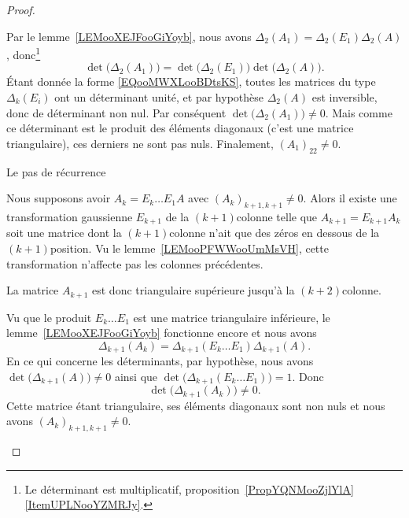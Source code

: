 \begin{proof}
\begin{subproof}
            Par le lemme~\ref{LEMooXEJFooGiYoyb}, nous avons \( \Delta_2(A_1)=\Delta_2(E_1)\Delta_2(A)\), donc\footnote{Le déterminant est multiplicatif, proposition~\ref{PropYQNMooZjlYlA}\ref{ItemUPLNooYZMRJy}.}
            \begin{equation}
                \det\big( \Delta_2(A_1) \big)=\det\big( \Delta_2(E_1) \big)\det\big( \Delta_2(A) \big).
            \end{equation}
            Étant donnée la forme \eqref{EQooMWXLooBDtsKS}, toutes les matrices du type \( \Delta_k(E_i)\) ont un déterminant unité, et par hypothèse \( \Delta_2(A)\) est inversible, donc de déterminant non nul. Par conséquent \( \det\big( \Delta_2(A_1) \big)\neq 0\). Mais comme ce déterminant est le produit des éléments diagonaux (c'est une matrice triangulaire), ces derniers ne sont pas nuls. Finalement, \( (A_1)_22\neq 0\).

        \item[Le pas de récurrence]

            Nous supposons avoir \( A_k=E_k\ldots E_1A\) avec \( (A_k)_{k+1,k+1}\neq 0\). Alors il existe une transformation gaussienne \( E_{k+1}\) de la \( (k+1)\)\ieme colonne telle que \( A_{k+1}=E_{k+1}A_k\) soit une matrice dont la \( (k+1)\)\ieme colonne n'ait que des zéros en dessous de la \( (k+1)\)\ieme position. Vu le lemme~\ref{LEMooPFWWooUmMsVH}, cette transformation n'affecte pas les colonnes précédentes.

            La matrice \( A_{k+1}\) est donc triangulaire supérieure jusqu'à la \( (k+2)\)\ieme colonne.

            Vu que le produit \( E_k\ldots E_1\) est une matrice triangulaire inférieure, le lemme~\ref{LEMooXEJFooGiYoyb} fonctionne encore et nous avons
            \begin{equation}
                \Delta_{k+1}(A_k)=\Delta_{k+1}(E_k\ldots E_1)\Delta_{k+1}(A).
            \end{equation}
            En ce qui concerne les déterminants, par hypothèse, nous avons \( \det\big( \Delta_{k+1}(A) \big)\neq 0\) ainsi que \( \det\big( \Delta_{k+1}(E_k\ldots E_1) \big)=1\). Donc
            \begin{equation}
                \det\big( \Delta_{k+1}(A_k) \big)\neq 0.
            \end{equation}
            Cette matrice étant triangulaire, ses éléments diagonaux sont non nuls et nous avons \( (A_k)_{k+1,k+1}\neq 0\).
    \end{subproof}


\end{proof}
